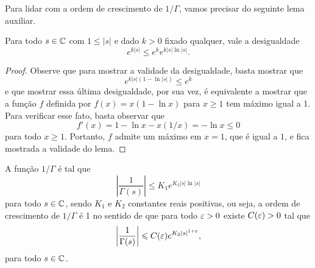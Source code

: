    Para lidar com a ordem de crescimento de $1/\Gamma$, vamos precisar
    do seguinte lema auxiliar.
    \begin{lema}
    \label{lema-aux-cresc-inv-gama}
        Para todo $s\in\mathbb{C}$ com $1\leq|s|$ e dado $k>0$ fixado qualquer,
        vale a desigualdade
        \[
        e^{k|s|} \leq e^k e^{k|s|\ln|s|}.
        \]
    \end{lema}
    \begin{proof}
        Observe que para mostrar a validade da desigualdade, basta 
        mostrar que
        \[
        e^{k|s|(1 - \ln|s|)} \leq e^k
        \]
        e que mostrar essa última desigualdade, por sua vez, é equivalente a mostrar que
        a função $f$ definida por $f(x) = x(1-\ln x)$ para $x\geq 1$ tem máximo igual a 1.
        Para verificar esse fato, basta observar que
        \[
        f'(x) = 1 - \ln x - x(1/x) = -\ln x \leq 0
        \]
        para todo $x\geq 1$. Portanto, $f$ admite um máximo em $x=1$, que é igual a $1$,
        e fica mostrada a validade do lema.
    \end{proof}
    \begin{teorema}
    \label{teo-ordem-cresc-inv-gama}
        A função $1/\Gamma$ é tal que
        \[
        \left| \frac{1}{\Gamma(s)} \right| \leq K_1e^{K_2|s|\ln|s|}
        \]
        para todo $s\in\mathbb{C}$, sendo $K_1$ e $K_2$ constantes reais positivas,
        ou seja, a ordem de crescimento de $1/\Gamma$ é 1 no sentido de que
        para todo $\varepsilon>0$ existe $C(\varepsilon)>0$ tal que
        \[
        \left| \frac{1}{\Gamma(s)} \right| \leqslant C(\varepsilon)e^{K_2|s|^{1+\varepsilon}},
        \]
        para todo $s\in\mathbb{C}$.
    \end{teorema}
